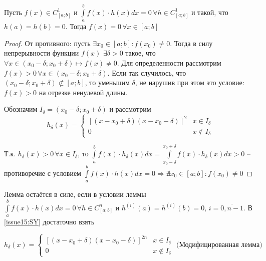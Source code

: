 \begin{lemma}
    Пусть $f(x) \in C^1_{[a;b]}$ и $\int \limits_a^b f(x) \cdot h(x) dx = 0 \, \forall h \in C^1_{[a;b]}$ и такой, что $h(a) = h(b) = 0$. Тогда $f(x) = 0 \, \forall x \in [a;b]$
\end{lemma}

\begin{proof}
    От противного: пусть $\exists x_0 \in [a;b]: f(x_0) \neq 0$. Тогда в силу непрерывности функции $f(x)$ $\exists \delta > 0$ такое, что $\forall x \in (x_0 - \delta; x_0 + \delta) \mapsto f(x) \neq 0$. 
    Для определенности рассмотрим $f(x) > 0 \, \forall x \in (x_0 - \delta; x_0 + \delta)$. 
    Если так случилось, что $(x_0 - \delta; x_0 + \delta) \not\subset [a;b]$, то уменьшим $\delta$, не нарушив при этом это условие: $f(x) > 0$ на отрезке ненулевой длины. 

    Обозначим $I_{\delta} = (x_0 - \delta; x_0 + \delta)$ и рассмотрим 
    \begin{equation} \label{issue15:SY}
        h_{\delta}(x) = \begin{cases}
            \left[(x - x_0 + \delta)(x - x_0 - \delta)\right]^2 & x \in I_{\delta}\\
            0 & x \not\in I_{\delta}
            \end{cases}
    \end{equation}
    
    Т.к. $h_{\delta}(x) > 0 \, \forall x \in I_{\delta}$, то $\int \limits_a^b f(x) \cdot h_{\delta}(x) dx  = \int \limits_{x_0 - \delta}^{x_0 + \delta} f(x) \cdot h_{\delta}(x) dx > 0$ 
    -- противоречие с условием $\int \limits_a^b f(x) \cdot h(x) dx = 0  \Rightarrow \nexists x_0 \in [a;b]: f(x_0) \neq 0$ 
    \end{proof}

    \begin{remark}
    
        Лемма остаётся в силе, если в условии леммы $\int \limits_a^b f(x) \cdot h(x) dx = 0 \, \forall h \in C^n_{[a;b]}$ и $h^{(i)}(a) = h^{(i)}(b) = 0, \, i = \overline{0, n-1}$. В \eqref{issue15:SY} достаточно взять 

        \begin{equation} \label{issue15:SY}
            h_{\delta}(x) = \begin{cases}
                \left[(x - x_0 + \delta)(x - x_0 - \delta)\right]^{2n} & x \in I_{\delta}\\
                0 & x \not\in I_{\delta}
                \end{cases} 
                \text{  (Модифицированная лемма)}
        \end{equation}
    \end{remark}
    
